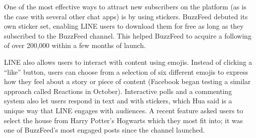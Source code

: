 \documentclass[notoc, symmetric, nobib, nols]{towcenter-guideto-book}
\begin{document}
One of the most effective ways to attract new subscribers on the platform (as is the case with several other chat apps) is by using stickers. BuzzFeed debuted its own sticker set, enabling LINE users to download them for free as long as they subscribed to the BuzzFeed channel. This helped BuzzFeed to acquire a following of over 200,000 within a few months of launch.



LINE also allows users to interact with content using emojis. Instead of clicking a ``like'' button, users can choose from a selection of six different emojis to express how they feel about a story or piece of content (Facebook began testing a similar approach called Reactions in October).\autocite{EngadgetFacebook}  Interactive polls and a commenting system also let users respond in text and with stickers, which Hua said is a unique way that LINE engages with audiences. A recent feature asked users to select the house from Harry Potter's Hogwarts which they most fit into; it was one of BuzzFeed's most engaged posts since the channel launched. 
\end{document}
